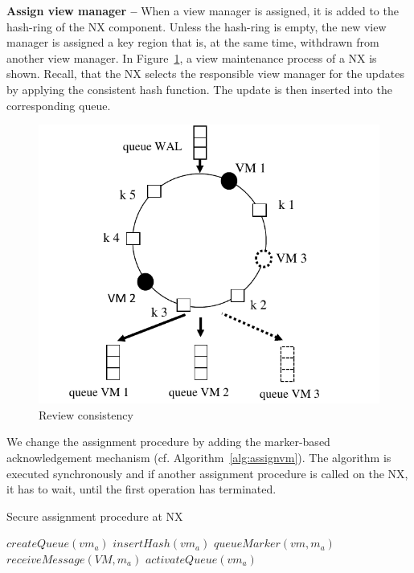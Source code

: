 \noindent
\textbf{Assign view manager -- } When a view manager is assigned, it 
is added to the hash-ring of the NX component. Unless the hash-ring 
is empty, the new view manager is assigned a key region that is, at the same 
time, withdrawn from another view manager. In 
Figure~\ref{fig:review_consistency}, a view maintenance process of a NX 
is shown. Recall, that the NX selects the responsible view manager for the 
updates by applying the consistent hash function. The update is then inserted 
into the corresponding queue. 


\begin{figure}[h!]
  \centering
    \includegraphics[width=\linewidth]{figures/ReviewConsistency}
        \vspace{-7mm}
    \caption{Review consistency}
        \vspace{-3mm}
    \label{fig:review_consistency}
\end{figure}

We change the assignment procedure by adding the marker-based acknowledgement mechanism (cf. Algorithm~\ref{alg:assignvm}). The algorithm is executed synchronously and if another assignment procedure is called on the NX, it has to wait, until the first operation has terminated.
  
\begin{algorithm}
\caption{Secure assignment procedure at NX}
\label{alg:assignvm}
\begin{algorithmic}[5]
\State $createQueue(vm_a)$
\State $insertHash(vm_a)$
\State $queueMarker(vm, m_a)$	
\EndFor
{}	
\State $receiveMessage(VM, m_a)$	
\EndFor
\State $activateQueue(vm_a)$	
\EndProcedure
\end{algorithmic}
\end{algorithm}
  
